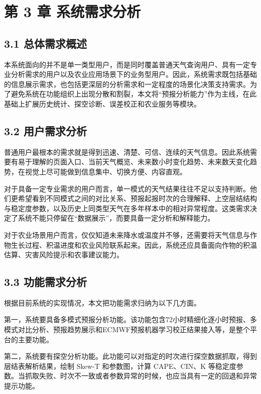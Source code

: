 \section{第 3 章 系统需求分析}

\subsection{3.1 总体需求概述}

本系统面向的并不是单一类型用户，而是同时覆盖普通天气查询用户、具有一定专业分析需求的用户以及农业应用场景下的业务型用户。因此，系统需求既包括基础的信息展示需求，也包括更深层的分析需求和一定程度的场景化决策支持需求。为了避免系统在功能组织上出现分散和割裂，本文将“预报分析能力”作为主线，在此基础上扩展历史统计、探空诊断、误差校正和农业服务等模块。

\subsection{3.2 用户需求分析}

普通用户最根本的需求就是得到迅速、清楚、可信、连续的天气信息。因此系统需要有易于理解的页面入口、当前天气概览、未来数小时变化趋势、未来数天变化趋势，在视觉上尽可能做到信息集中、切换方便、内容直观。

对于具备一定专业需求的用户而言，单一模式的天气结果往往不足以支持判断。他们更希望看到不同模式之间的对比关系、预报起报时次的合理解释、上空层结结构与稳定度参数，以及历史上同类型天气在多年样本中的相对异常程度。这类需求决定了系统不能只停留在“数据展示”，而要具备一定分析和解释能力。

对于农业场景用户而言，仅仅知道未来降水或温度并不够，还需要将天气信息与作物生长过程、积温进度和农业风险联系起来。因此，系统还应具备面向作物的积温估算、灾害风险提示和农事建议能力。

\subsection{3.3 功能需求分析}

根据目前系统的实现情况，本文把功能需求归纳为以下几方面。

第一，系统要具备多模式预报分析功能。该功能包含72小时精细化逐小时预报、多模式对比分析、预报趋势展示和ECMWF预报机器学习校正结果接入等，是整个平台的主要功能。

第二，系统要有探空分析功能。此功能可以对指定的时次进行探空数据抓取，得到层结表解析结果，绘制 Skew-T 和参数图，计算 CAPE、CIN、K 等稳定度参数。当抓取失败、时次不一致或者参数异常的时候，也应当具有一定的回退和异常提示功能。

